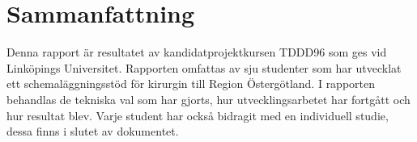 \section*{Sammanfattning}
Denna rapport är resultatet av kandidatprojektkursen TDDD96 som ges vid Linköpings Universitet. Rapporten omfattas av sju studenter som har utvecklat ett schemaläggningsstöd för kirurgin till Region Östergötland. I rapporten behandlas de tekniska val som har gjorts, hur utvecklingsarbetet har fortgått och hur resultat blev. Varje student har också bidragit med en individuell studie, dessa finns i slutet av dokumentet.
\clearpage
